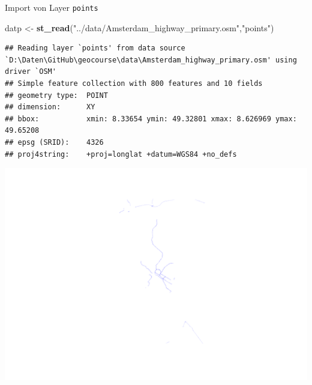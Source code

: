 \documentclass[ignorenonframetext,]{beamer}
\newenvironment{Shaded}{\begin{snugshade}}{\end{snugshade}}
\newcommand{\KeywordTok}[1]{\textcolor[rgb]{0.13,0.29,0.53}{\textbf{#1}}}
\newcommand{\DataTypeTok}[1]{\textcolor[rgb]{0.13,0.29,0.53}{#1}}
\newcommand{\DecValTok}[1]{\textcolor[rgb]{0.00,0.00,0.81}{#1}}
\newcommand{\StringTok}[1]{\textcolor[rgb]{0.31,0.60,0.02}{#1}}
\newcommand{\OperatorTok}[1]{\textcolor[rgb]{0.81,0.36,0.00}{\textbf{#1}}}
\newcommand{\NormalTok}[1]{#1}
\begin{document}
\begin{frame}[fragile]{Import von Layer \texttt{points}}

\begin{Shaded}
\begin{Highlighting}[]
\NormalTok{datp <-}\StringTok{ }\KeywordTok{st_read}\NormalTok{(}\StringTok{"../data/Amsterdam_highway_primary.osm"}\NormalTok{,}\StringTok{"points"}\NormalTok{)}
\end{Highlighting}
\end{Shaded}

\begin{verbatim}
## Reading layer `points' from data source `D:\Daten\GitHub\geocourse\data\Amsterdam_highway_primary.osm' using driver `OSM'
## Simple feature collection with 800 features and 10 fields
## geometry type:  POINT
## dimension:      XY
## bbox:           xmin: 8.33654 ymin: 49.32801 xmax: 8.626969 ymax: 49.65208
## epsg (SRID):    4326
## proj4string:    +proj=longlat +datum=WGS84 +no_defs
\end{verbatim}

\begin{Shaded}
\end{Shaded}

\includegraphics{slides_all2gether_part2_files/figure-beamer/unnamed-chunk-79-1.pdf}

\end{frame}
\end{document}
